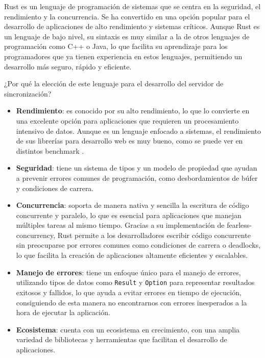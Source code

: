 Rust es un lenguaje de programación de sistemas que se centra en la seguridad, el rendimiento y la concurrencia. Se ha convertido en una opción popular para el desarrollo de aplicaciones de alto rendimiento y sistemas críticos.
Aunque Rust es un lenguaje de bajo nivel, su sintaxis es muy similar a la de otros lenguajes de programación como C++ o Java, lo que facilita su aprendizaje para los programadores que ya tienen experiencia en estos lenguajes, permitiendo un desarrollo más seguro, rápido y eficiente.

¿Por qué la elección de este lenguaje para el desarrollo del servidor de sincronización? \parencite{rust-for-safety-and-performance}
\begin{itemize}
    \item \textbf{Rendimiento}: es conocido por su alto rendimiento, lo que lo convierte en una excelente opción para aplicaciones que requieren un procesamiento intensivo de datos. Aunque es un lenguaje enfocado a sistemas, el rendimiento de sus librerías para desarrollo web es muy bueno, como se puede ver en distintos benchmark \parencite{rust-benchmark}.
    \item \textbf{Seguridad}: tiene un sistema de tipos y un modelo de propiedad que ayudan a prevenir errores comunes de programación, como desbordamientos de búfer y condiciones de carrera.
    \item \textbf{Concurrencia}: soporta de manera nativa y sencilla la escritura de código concurrente y paralelo, lo que es esencial para aplicaciones que manejan múltiples tareas al mismo tiempo.
        Gracias a su implementación de \gls{fearless-concurrency}, Rust permite a los desarrolladores escribir código concurrente sin preocuparse por errores comunes como condiciones de carrera o deadlocks, lo que facilita la creación de aplicaciones altamente eficientes y escalables.
    \item \textbf{Manejo de errores}: tiene un enfoque único para el manejo de errores, utilizando tipos de datos como \texttt{Result} y \texttt{Option} para representar resultados exitosos y fallidos, lo que ayuda a evitar errores en tiempo de ejecución, consiguiendo de esta manera no encontrarnos con errores inesperados a la hora de ejecutar la aplicación.
    \item \textbf{Ecosistema}: cuenta con un ecosistema en crecimiento, con una amplia variedad de bibliotecas y herramientas que facilitan el desarrollo de aplicaciones.
\end{itemize}


